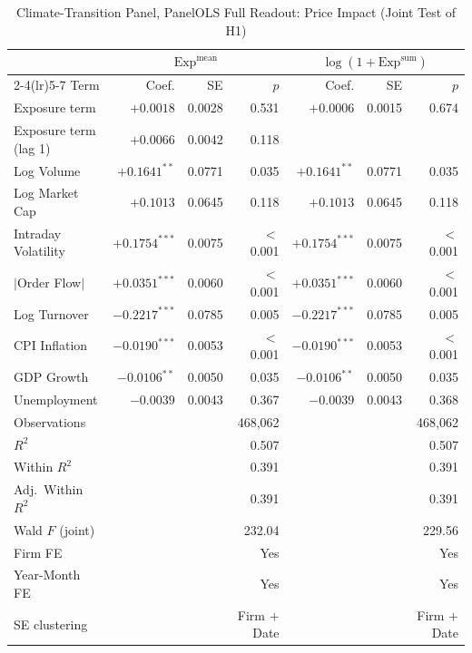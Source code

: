 \begin{table}[!ht]
\centering
\caption{Climate-Transition Panel, PanelOLS Full Readout: Price Impact (Joint Test of H1)}
\label{tab:v2_priceimpact}
\begin{threeparttable}
\small
\setlength{\tabcolsep}{4pt}
\begin{tabular}{l r r r r r r}
\toprule
 & \multicolumn{3}{c}{$\mathrm{Exp}^{\text{mean}}$} & \multicolumn{3}{c}{$\log(1+\mathrm{Exp}^{\text{sum}})$} \\
\cmidrule(lr){2-4}\cmidrule(lr){5-7}
Term & Coef. & SE & $p$ & Coef. & SE & $p$ \\
\midrule
Exposure term & $+0.0018$ & 0.0028 & 0.531 & $+0.0006$ & 0.0015 & 0.674 \\
Exposure term (lag 1)\tnote{a} & $+0.0066$ & 0.0042 & 0.118 & & & \\
Log Volume & $+0.1641^{**}$ & 0.0771 & 0.035 & $+0.1641^{**}$ & 0.0771 & 0.035 \\
Log Market Cap & $+0.1013$ & 0.0645 & 0.118 & $+0.1013$ & 0.0645 & 0.118 \\
Intraday Volatility & $+0.1754^{***}$ & 0.0075 & $<$0.001 & $+0.1754^{***}$ & 0.0075 & $<$0.001 \\
$|$Order Flow$|$ & $+0.0351^{***}$ & 0.0060 & $<$0.001 & $+0.0351^{***}$ & 0.0060 & $<$0.001 \\
Log Turnover & $-0.2217^{***}$ & 0.0785 & 0.005 & $-0.2217^{***}$ & 0.0785 & 0.005 \\
CPI Inflation & $-0.0190^{***}$ & 0.0053 & $<$0.001 & $-0.0190^{***}$ & 0.0053 & $<$0.001 \\
GDP Growth & $-0.0106^{**}$ & 0.0050 & 0.035 & $-0.0106^{**}$ & 0.0050 & 0.035 \\
Unemployment & $-0.0039$ & 0.0043 & 0.367 & $-0.0039$ & 0.0043 & 0.368 \\
\midrule
Observations & & & 468,062 & & & 468,062 \\
$R^2$ & & & 0.507 & & & 0.507 \\
Within $R^2$ & & & 0.391 & & & 0.391 \\
Adj.\ Within $R^2$ & & & 0.391 & & & 0.391 \\
Wald $F$ (joint) & & & 232.04 & & & 229.56 \\
Firm FE & & & Yes & & & Yes \\
Year-Month FE & & & Yes & & & Yes \\
SE clustering & & & Firm $+$ Date & & & Firm $+$ Date \\
\bottomrule
\end{tabular}

\end{threeparttable}
\end{table}
